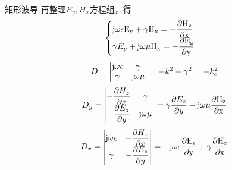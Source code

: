 \begin{frame}{矩形波导}
    再整理$E_y,H_x$方程组，得
    \begin{align*}
        \begin{cases}
            \rm{j}\omega\epsilon E_y+\gamma H_x=-\dfrac{\partial H_z}{\partial x} \\
            \gamma E_y+\rm{j}\omega\mu H_x=-\dfrac{\partial E_z}{\partial y}
        \end{cases}
    \end{align*}
    \begin{align*}
        D=
        \begin{vmatrix}
            \rm{j}\omega\epsilon & \gamma          \\
            \gamma               & \rm{j}\omega\mu \\
        \end{vmatrix}
        =-k^2-\gamma^2=-k_c^2
    \end{align*}
    \begin{align*}
        D_y=
        \begin{vmatrix}
            -\dfrac{\partial H_z}{\partial x} & \gamma          \\
            -\dfrac{\partial E_z}{\partial y} & \rm{j}\omega\mu \\
        \end{vmatrix}
        =\gamma\frac{\partial E_z}{\partial y}-\rm{j}\omega\mu\frac{\partial H_z}{\partial x}
    \end{align*}
    \begin{align*}
        D_x=
        \begin{vmatrix}
            \rm{j}\omega\epsilon & -\dfrac{\partial H_z}{\partial x} \\
            \gamma               & -\dfrac{\partial E_z}{\partial y} \\
        \end{vmatrix}
        =-\rm{j}\omega\epsilon\frac{\partial E_z}{\partial y}+\gamma \frac{\partial H_z}{\partial x}
    \end{align*}
\end{frame}

